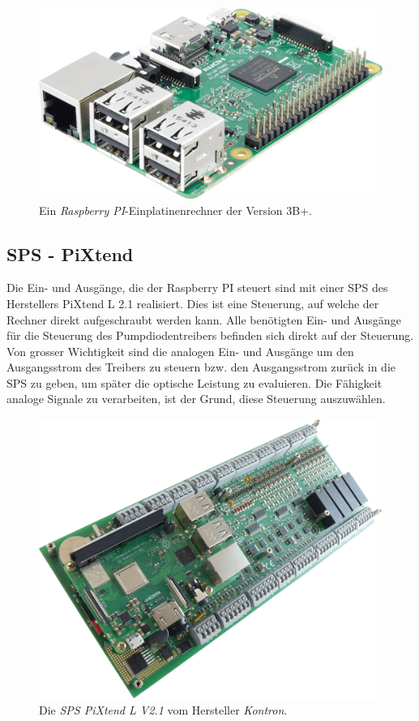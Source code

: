 \begin{figure}[H]
    \centering
    \includegraphics[scale=0.25]{98_images/raspberry_pi_version_3_b.jpg}
    \caption{Ein \textit{Raspberry PI}-Einplatinenrechner der Version  3B+.}
    \label{fig:raspberry_pi_3b+}
\end{figure}

\subsection{SPS - PiXtend}
Die Ein- und Ausgänge, die der Raspberry PI steuert sind mit einer SPS des Herstellers PiXtend L 2.1 realisiert. Dies ist eine Steuerung, auf welche der Rechner direkt aufgeschraubt werden kann. Alle benötigten Ein- und Ausgänge für die Steuerung des Pumpdiodentreibers befinden sich direkt auf der Steuerung. Von grosser Wichtigkeit sind die analogen Ein- und Ausgänge um den Ausgangsstrom des Treibers zu steuern bzw. den Ausgangsstrom zurück in die SPS zu geben, um später die optische Leistung zu evaluieren. Die Fähigkeit analoge Signale zu verarbeiten, ist der Grund, diese Steuerung auszuwählen.

\begin{figure}[H]
    \centering
    \includegraphics[scale=0.08]{98_images/pixtend_l_basic.png}
    \caption{Die \textit{SPS PiXtend L V2.1} vom Hersteller \textit{Kontron}.}
    \label{fig:sps_pixtend_hw}
\end{figure}

